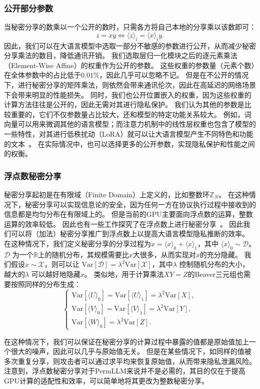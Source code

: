 \subsubsection{公开部分参数}
当秘密分享的数乘以一个公开的数时，只需各方将自己本地的分享乘以该数即可：
\begin{equation}
    z = xy \Leftrightarrow \langle z \rangle_i = \langle x \rangle_i y.
\end{equation}
%
因此，我们可以在大语言模型中选取一部分不敏感的参数进行公开，从而减少秘密分享乘法的数目，降低通讯开销。
%
我们选取层归一化模块之后的逐元素乘法（Element-Wise Affine）的权重作为公开的参数。
%
这些权重的参数量（元素个数）在全体参数中的占比低于$0.01\%$，因此几乎可以忽略不记。
但是在不公开的情况下，进行秘密分享的矩阵乘法，则依然会带来通讯伦次，因此在高延迟的网络场景下会带来明显的性能损失。
%
同时，我们也公开位置嵌入的权重，因为这些权重的计算方法往往是公开的，因此无需对其进行隐私保护。
%
我们认为其他的参数是比较重要的，它们不仅参数量占比较大，还和模型的特定功能关系较大。
%
例如，词向量可以用来微调其他的语言模型；而注意力机制中的线性层权重也包含了模型的一些特性，对其进行低秩扰动（LoRA）就可以让大语言模型产生不同特色和功能的文本~\cite{}。
%
在实际情况中，也可以选择更多的公开参数，实现隐私保护和性能之间的权衡。

%
\subsubsection{浮点数秘密分享}
秘密分享起初是在有限域（Finite Domain）上定义的，比如整数环$\mathbb Z_N$。
在这种情况下，秘密分享可以实现信息论的安全，因为任何一方在协议执行过程中接收到的信息都是均匀分布在有限域上的。
%
但是当前的GPU主要面向浮点数的运算，整数运算的效率较低。
因此也有一些工作探究了在浮点数上进行秘密分享~\cite{}。
因此我们可以将（加法）秘密分享推广到浮点数上以提高大语言模型隐私推断的效率。
%
在这种情况下，我们定义秘密分享的分享过程为$x = \langle x \rangle_0 + \langle x \rangle_1$，其中 $\langle x \rangle_0 \sim \mathcal D$。
%
$\mathcal D$ 为一个$\mathbb R$上的随机分布，其规模需要比$x$大很多，从而实现对$x$的充分隐藏。
%
我们假设$x \sim \mathcal X$，则可以让 $\text{Var}[\mathcal D] = \lambda^2 \text{Var}[\mathcal X]$，其中$\lambda$ 控制随机分布的大小，越大的$\lambda$ 可以越好地隐藏$x$。
%
类似地，用于计算乘法$XY=Z$的Beaver三元组也需要按照同样的分布生成：
\begin{equation}
\begin{cases}
    \text{Var}[\langle U \rangle_0] = \text{Var}[\langle U \rangle_1] = \lambda^2 \text{Var}[X], \\
    \text{Var}[\langle V \rangle_0] = \text{Var}[\langle V \rangle_1] = \lambda^2 \text{Var}[Y], \\
    \text{Var}[\langle W \rangle_0] = \lambda^2 \text{Var}[Z].
\end{cases}
\end{equation}
%

在这种情况下，我们可以保证在秘密分享的计算过程中暴露的值都是原始值加上一个很大的噪声，因此可以几乎与原始值无关。
%
但是在某些情况下，如同样的值被多次重复分享，则攻击者可以通过求平均来恢复原始值，从而带来隐私泄漏风险。
%
注意到，浮点数秘密分享对于PermLLM来说并不是必需的，其目的仅在于提高GPU计算的适配性和效率，可以简单地将其更改为整数秘密分享。
%

